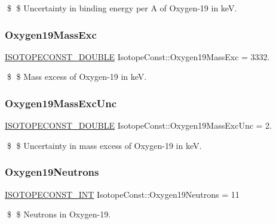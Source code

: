 \$ \$ Uncertainty in binding energy per A of Oxygen-\/19 in keV. \mbox{\label{group___isotope_const-_oxygen-_o19_ga220db92948d0afd8b149aeb0395ae902}} 
\subsubsection{\texorpdfstring{Oxygen19\+Mass\+Exc}{Oxygen19MassExc}}
{\footnotesize\ttfamily \mbox{\hyperlink{group___isotope_const-_macros_ga8f45a7272ce02c0b4c65c44636ed719a}{I\+S\+O\+T\+O\+P\+E\+C\+O\+N\+S\+T\+\_\+\+D\+O\+U\+B\+LE}} Isotope\+Const\+::\+Oxygen19\+Mass\+Exc = 3332.}

\$ \$ Mass excess of Oxygen-\/19 in keV. \mbox{\label{group___isotope_const-_oxygen-_o19_gabbe0b66b430881fe5374236abdaf715c}} 
\subsubsection{\texorpdfstring{Oxygen19\+Mass\+Exc\+Unc}{Oxygen19MassExcUnc}}
{\footnotesize\ttfamily \mbox{\hyperlink{group___isotope_const-_macros_ga8f45a7272ce02c0b4c65c44636ed719a}{I\+S\+O\+T\+O\+P\+E\+C\+O\+N\+S\+T\+\_\+\+D\+O\+U\+B\+LE}} Isotope\+Const\+::\+Oxygen19\+Mass\+Exc\+Unc = 2.}

\$ \$ Uncertainty in mass excess of Oxygen-\/19 in keV. \mbox{\label{group___isotope_const-_oxygen-_o19_ga31c132472721371518f2551fc4137959}} 
\subsubsection{\texorpdfstring{Oxygen19\+Neutrons}{Oxygen19Neutrons}}
{\footnotesize\ttfamily \mbox{\hyperlink{group___isotope_const-_macros_ga5f18360b3e99483a35c32d789e62621c}{I\+S\+O\+T\+O\+P\+E\+C\+O\+N\+S\+T\+\_\+\+I\+NT}} Isotope\+Const\+::\+Oxygen19\+Neutrons = 11}

\$ \$ Neutrons in Oxygen-\/19. \mbox{\label{group___isotope_const-_oxygen-_o19_gad62836019bfa8e2075470fbf1554db84}} 
